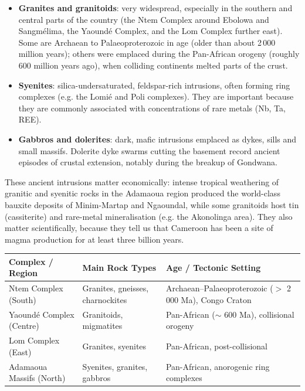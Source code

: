 \documentclass[11pt]{article}
\newcommand{\cle}[1]{{\popxbold\color{popdark}#1}}
\begin{document}
\begin{itemize}
\item \textbf{Granites and granitoids}: very widespread, especially in the southern and central parts of the country (the Ntem Complex around Ebolowa and Sangmélima, the Yaoundé Complex, and the Lom Complex further east). Some are Archaean to Palaeoproterozoic in age (older than about 2\,000 million years); others were emplaced during the \cle{Pan-African orogeny} (roughly 600 million years ago), when colliding continents melted parts of the crust.
\item \textbf{Syenites}: silica-undersaturated, feldspar-rich intrusions, often forming ring complexes (e.g. the Lomié and Poli complexes). They are important because they are commonly associated with concentrations of rare metals (Nb, Ta, REE).
\item \textbf{Gabbros and dolerites}: dark, mafic intrusions emplaced as dykes, sills and small massifs. Dolerite dyke swarms cutting the basement record ancient episodes of crustal extension, notably during the breakup of Gondwana.
\end{itemize}

These ancient intrusions matter economically: intense tropical weathering of granitic and syenitic rocks in the Adamaoua region produced the world-class \cle{bauxite} deposits of Minim-Martap and Ngaoundal, while some granitoids host tin (cassiterite) and rare-metal mineralisation (e.g. the Akonolinga area). They also matter scientifically, because they tell us that Cameroon has been a site of magma production for at least three billion years.

\begin{center}
\begin{tabularx}{\linewidth}{|l|X|X|}
\hline
\rowcolor{popblueL} \textbf{Complex / Region} & \textbf{Main Rock Types} & \textbf{Age / Tectonic Setting} \\
\hline
Ntem Complex (South) & Granites, gneisses, charnockites & Archaean--Palaeoproterozoic ($>$ 2\,000 Ma), Congo Craton \\
\hline
Yaoundé Complex (Centre) & Granitoids, migmatites & Pan-African ($\sim$ 600 Ma), collisional orogeny \\
\hline
Lom Complex (East) & Granites, syenites & Pan-African, post-collisional \\
\hline
Adamaoua Massifs (North) & Syenites, granites, gabbros & Pan-African, anorogenic ring complexes \\
\hline
\end{tabularx}
\end{center}
\end{document}
